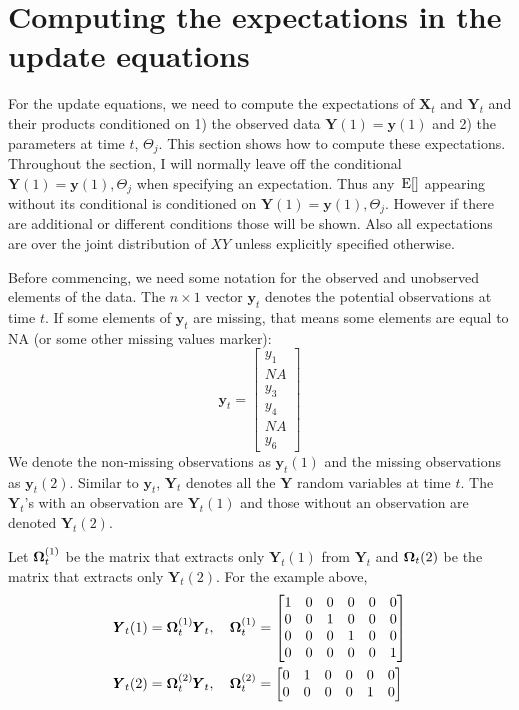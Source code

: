 \documentclass[]{article}
\def\OMG{\mbox{\boldmath $\Omega$}}
\def\XX{\mbox{$\pmb{X}$}}	\def\xx{\mbox{$\pmb{x}$}}
\def\YY{\mbox{$\pmb{Y}$}}	\def\yy{\mbox{$\pmb{y}$}}
\def\E{\,\textup{\textrm{E}}}
\begin{document}
\section{Computing the expectations in the update equations}\label{sec:compexpectations}
For the update equations, we need to compute the expectations of $\XX_t$ and $\YY_t$ and their products conditioned on 1) the observed data $\YY(1)=\yy(1)$ and 2) the parameters at time $t$, $\Theta_j$.  This section shows how to compute these expectations.  Throughout the section, I will normally leave off the conditional $\YY(1)=\yy(1),\Theta_j$ when specifying an expectation. Thus any $\E[ ]$ appearing without its conditional is conditioned on $\YY(1)=\yy(1),\Theta_j$.  However if there are additional or different conditions those will be shown.  Also all expectations are over the joint distribution of $XY$ unless explicitly specified otherwise.

Before commencing, we need some notation for the observed and unobserved elements of the data.
The $n \times 1$ vector $\yy_t$ denotes the potential observations at time $t$. If some elements of $\yy_t$ are missing, that means some elements are equal to NA (or some other missing values marker):
\begin{equation}
\yy_t=\begin{bmatrix}
y_1\\
NA\\
y_3\\
y_4\\
NA\\
y_6
\end{bmatrix}
\end{equation}
We denote the non-missing observations as $\yy_t(1)$ and the missing observations as $\yy_t(2)$.  Similar to $\yy_t$, $\YY_t$ denotes all the $\YY$ random variables at time $t$.  The $\YY_t$'s with an observation are  $\YY_t(1)$ and those without an observation are denoted $\YY_t(2)$. 

Let $\OMG_t^{(1)}$ be the matrix that extracts only $\YY_t(1)$ from $\YY_t$ and $\OMG_t(2)$ be the matrix that extracts only $\YY_t(2)$.  For the example above,
\begin{equation}
\begin{split}
&\YY_t(1)=\OMG_t^{(1)} \YY_t,\quad \OMG_t^{(1)} = 
\begin{bmatrix}
1&0&0&0&0&0\\
0&0&1&0&0&0\\
0&0&0&1&0&0\\
0&0&0&0&0&1\\
\end{bmatrix}\\
&\YY_t(2)=\OMG_t^{(2)} \YY_t,\quad \OMG_t^{(2)} = 
\begin{bmatrix}
0&1&0&0&0&0\\
0&0&0&0&1&0
\end{bmatrix}
\end{split}
\end{equation}
\end{document}
